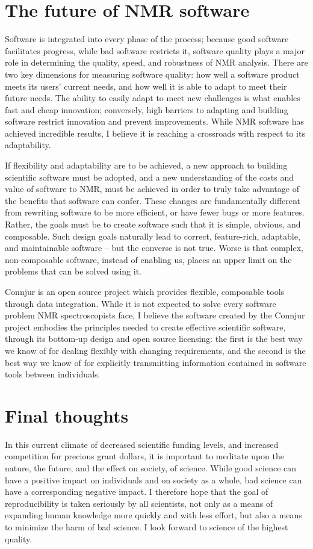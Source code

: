 \section{The future of NMR software}
Software is integrated into every phase of the process;
because good software facilitates progress, while bad software restricts it,
software quality plays a major role in determining the quality, speed, and 
robustness of NMR analysis. 
There are two key dimensions for measuring software quality: how well a 
software product meets its users' current needs, and how well it is able to
adapt to meet their future needs.  The ability to easily adapt to meet new 
challenges is what enables fast and cheap innovation; conversely, high
barriers to adapting and building software restrict innovation and prevent
improvements.  While NMR software has achieved incredible results, I believe
it is reaching a crossroads with respect to its adaptability.

If flexibility and adaptability are to be achieved,
a new approach to building scientific software must be adopted, and 
a new understanding of the costs and value of software to NMR, must be 
achieved in order to truly take advantage of the benefits that software can
confer.  These changes are fundamentally different from rewriting software
to be more efficient, or have fewer bugs or more features.  Rather, the
goals must be to create software such that it is simple, obvious, and 
composable.  Such design goals naturally lead to correct, feature-rich, 
adaptable, and maintainable software -- but the converse is not true.  Worse
is that complex, non-composable software, instead of enabling
us, places an upper limit on the problems that can be solved using it.

Connjur is an open source project which provides flexible, composable tools
through data integration.  While it is not expected to solve every software
problem NMR spectroscopists face, I believe the software created by the Connjur
project embodies the principles needed to create effective scientific
software, through its bottom-up design and open source licensing:
the first is the best way we know of for dealing flexibly with changing
requirements, and the second is the best way we know of for explicitly 
transmitting information contained in software tools between individuals.


\section{Final thoughts}
In this current climate of decreased scientific funding levels, and increased
competition for precious grant dollars, it is important to meditate upon the
nature, the future, and the effect on society, of science.
While good science can have a positive impact on individuals and on society 
as a whole, bad science can have a corresponding negative impact.
I therefore hope that the goal of reproducibility is taken seriously by all
scientists, not only as a means of expanding human knowledge more quickly and
with less effort, but also a means to minimize the harm of bad science.
I look forward to science of the highest quality.


